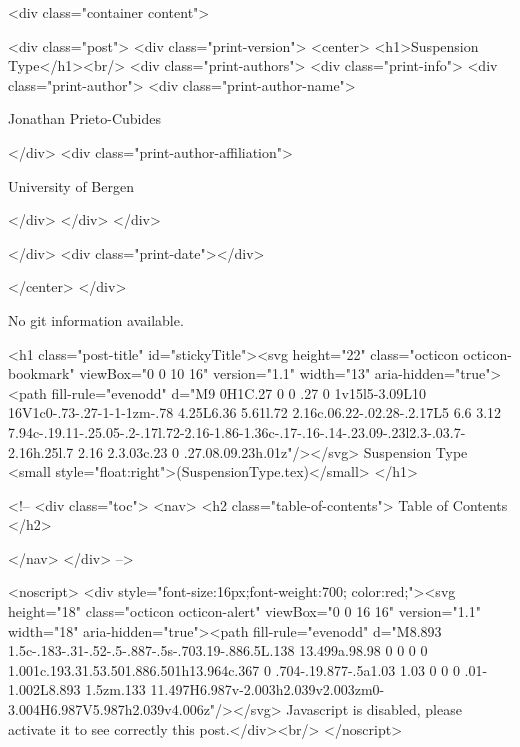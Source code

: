       <div class="container content">
        







<div class="post">
  <div class="print-version">
    <center>
      <h1>Suspension Type</h1><br/>
        <div class="print-authors">
          <div class="print-info">
            <div class="print-author">
              <div class="print-author-name">
                
                  Jonathan Prieto-Cubides
                
              </div>
              <div class="print-author-affiliation">
                
                  University of Bergen
                
                </div>
            </div>
          </div>
          
          
        </div>
        <div class="print-date"></div>
        
        
    </center>
  </div>

  
  No git information available.
  

  <h1 class="post-title" id="stickyTitle"><svg height="22" class="octicon octicon-bookmark" viewBox="0 0 10 16" version="1.1" width="13" aria-hidden="true"><path fill-rule="evenodd" d="M9 0H1C.27 0 0 .27 0 1v15l5-3.09L10 16V1c0-.73-.27-1-1-1zm-.78 4.25L6.36 5.61l.72 2.16c.06.22-.02.28-.2.17L5 6.6 3.12 7.94c-.19.11-.25.05-.2-.17l.72-2.16-1.86-1.36c-.17-.16-.14-.23.09-.23l2.3-.03.7-2.16h.25l.7 2.16 2.3.03c.23 0 .27.08.09.23h.01z"/></svg> Suspension Type <small style="float:right">(SuspensionType.tex)</small>
  </h1>

  <!-- 
  <div class="toc">
    <nav>
    <h2 class="table-of-contents"> Table of Contents </h2>
      

    </nav>
  </div>
   -->

  <noscript>
  <div style="font-size:16px;font-weight:700; color:red;"><svg height="18" class="octicon octicon-alert" viewBox="0 0 16 16" version="1.1" width="18" aria-hidden="true"><path fill-rule="evenodd" d="M8.893 1.5c-.183-.31-.52-.5-.887-.5s-.703.19-.886.5L.138 13.499a.98.98 0 0 0 0 1.001c.193.31.53.501.886.501h13.964c.367 0 .704-.19.877-.5a1.03 1.03 0 0 0 .01-1.002L8.893 1.5zm.133 11.497H6.987v-2.003h2.039v2.003zm0-3.004H6.987V5.987h2.039v4.006z"/></svg> Javascript is disabled, please activate it to see correctly this post.</div><br/>
  </noscript>


